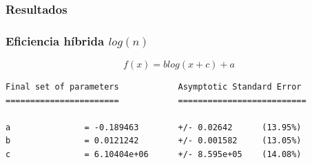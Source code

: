 \documentclass[spanish]{beamer}
\begin{document}
\begin{frame}[fragile]\frametitle{Resultados}
  \begin{figure}[H]
  \centering   
    \end{figure}
  \end{frame}

  
\begin{frame}[fragile]\frametitle{Eficiencia híbrida $log(n)$}
  \begin{figure}[H]
  \centering   
    \end{figure}
  \end{frame}

\footnotesize %
\begin{frame}[fragile]
  \[f(x) = blog(x+c)+a\]
  
\begin{verbatim}
Final set of parameters            Asymptotic Standard Error
=======================            ==========================

a               = -0.189463        +/- 0.02642      (13.95%)
b               = 0.0121242        +/- 0.001582     (13.05%)
c               = 6.10404e+06      +/- 8.595e+05    (14.08%)
\end{verbatim}
\end{frame}
\end{document}
